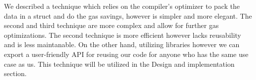 We described a technique which relies on the compiler's optimizer to pack the data in a struct and do the gas savings, however is simpler and more elegant. The second and third technique are more complex and allow for further gas optimizations. The second technique is more efficient however lacks reusability and is less maintanable. On the other hand, utilizing libraries however we can export a user-friendly API for reusing our code for anyone who has the same use case as us. This technique will be utilized in the Design and implementation section.